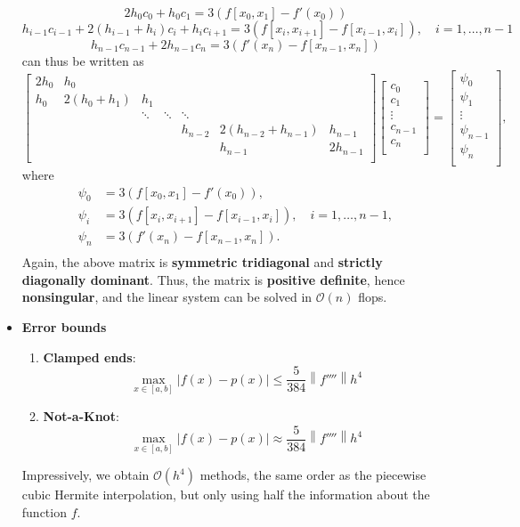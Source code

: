 \documentclass{report}
\begin{document}
\begin{itemize}
            $$2h_0 c_0 + h_0 c_1 = 3\left(f[x_0,x_1] - f'(x_0)\right)$$
            $$h_{i-1}c_{i-1} + 2(h_{i-1} + h_i )c_i + h_i c_{i+1} = 3\left(f[x_i,x_{i+1}] - f[x_{i-1},x_{i}]\right), \quad i=1,\ldots,n-1$$
            $$h_{n-1} c_{n-1} + 2 h_{n-1} c_n = 3\left(f'(x_n) - f[x_{n-1},x_n]\right)$$
            can thus be written as
            $$
            \begin{bmatrix}
                2h_0 & h_0\\
                h_0& 2(h_0 + h_1) & h_1 \\
                   & &\ddots & \ddots & \ddots \\
                   &&&& h_{n-2} & 2(h_{n-2} + h_{n-1}) & h_{n-1} \\
                   &&&&& h_{n-1} & 2h_{n-1} \\
            \end{bmatrix}
            \begin{bmatrix}
                c_0\\c_1\\\vdots\\c_{n-1}\\c_n\\
            \end{bmatrix}
            =
            \begin{bmatrix}
                \psi_0\\\psi_1\\\vdots\\\psi_{n-1}\\\psi_n\\
            \end{bmatrix},
            $$
            where
            $$
            \begin{align}
                \psi_0 &= 3\left(f[x_0,x_1] - f'(x_0)\right),\\
                \psi_i &= 3\left(f[x_i,x_{i+1}] - f[x_{i-1},x_{i}]\right), \quad i = 1,\ldots,n-1, \\
                \psi_n &= 3\left(f'(x_n) - f[x_{n-1},x_n]\right).\\
            \end{align}
            $$
            Again, the above matrix is \textbf{symmetric tridiagonal} and \textbf{strictly diagonally dominant}.
            \bigbreak \noindent 
        Thus, the matrix is \textbf{positive definite}, hence \textbf{nonsingular}, and the linear system can be solved in $\mathcal{O}(n)$ flops.
    \item \textbf{Error bounds}
        \begin{enumerate}
            \item \textbf{Clamped ends}:
                $$\max_{x \in [a,b]} \left|f(x) - p(x) \right| \leq \frac{5}{384} \left\|f''''\right\| h^4$$
            \item \textbf{Not-a-Knot}:
                $$\max_{x \in [a,b]} \left|f(x) - p(x) \right| \approx \frac{5}{384} \left\|f''''\right\| h^4$$
        \end{enumerate}
        Impressively, we obtain $\mathcal{O}(h^4)$ methods, the same order as the piecewise cubic Hermite interpolation, but only using half the information about the function $f$.


\end{itemize}
\end{document}
